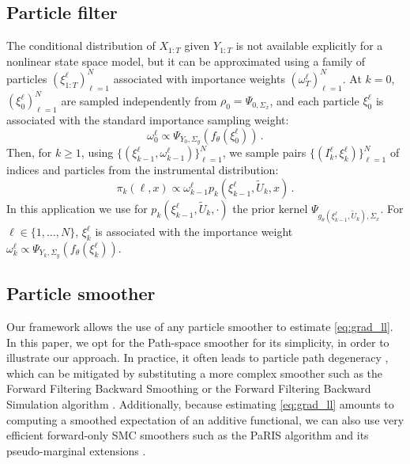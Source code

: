 \documentclass[conference]{IEEEtran}
\begin{document}
\subsection{Particle filter}
The conditional distribution of $X_{1:T}$ given $Y_{1:T}$ is not available explicitly for a nonlinear state space model, but it can be approximated using a family of particles $(\xi^{\ell}_{1:T})_{\ell=1}^N$ associated with importance weights $(\omega^{\ell}_T)_{\ell=1}^N$.
At $k = 0$, $(\xi^{\ell}_0)_{\ell=1}^N$ are sampled independently from $\rho_0 = \Psi_{0, \Sigma_x}$, and each particle $\xi^{\ell}_0$ is associated with the standard importance sampling weight:
\[
	\omega_0^{\ell} \propto  \Psi_{Y_0, \Sigma_y}(f_\theta(\xi^{\ell}_0)) \,.
\]
Then, for $k\geq 1$, using $\{(\xi^{\ell}_{k-1},\omega^{\ell}_{k-1})\}_{\ell=1}^N$, we sample pairs $\{(I^{\ell}_k,\xi^{\ell}_{k})\}_{\ell=1}^N$ of indices and particles from the instrumental distribution:
\[
	\pi_{k}(\ell,x) \propto \omega_{k-1}^{\ell} p_k(\xi^{\ell}_{k-1},\widetilde U_k,x)\,.
\]
In this application we use for $p_k(\xi^{\ell}_{k-1},\widetilde U_k,\cdot)$ the prior kernel $\Psi_{g_\theta(\xi^\ell_{k-1}, \tilde U_k), \Sigma_x}$.
For $\ell \in \{1,\ldots,N\}$, $\xi^{\ell}_k$ is associated with the importance weight $\omega^{\ell}_k \propto \Psi_{Y_k, \Sigma_y}(f_\theta(\xi^{\ell}_k))$.%

\subsection{Particle smoother}
Our framework allows the use of any particle smoother to estimate \eqref{eq:grad_ll}.
In this paper, we opt for the Path-space smoother \cite{Kitagawa1996} for its simplicity, in order to illustrate our approach.
In practice, it often leads to particle path degeneracy \cite{Andrieu2005}, which can be mitigated by substituting a more complex smoother such as the Forward Filtering Backward Smoothing \cite{Doucet2000OnSM} or the Forward Filtering Backward Simulation algorithm \cite{Godsill2004MonteCS}.
Additionally, because estimating \eqref{eq:grad_ll} amounts to computing a smoothed expectation of an additive functional, we can also use very efficient forward-only SMC smoothers such as the PaRIS algorithm and its pseudo-marginal extensions \cite{Olsson2014EfficientPO,gloaguen2022pseudo}.
\end{document}

